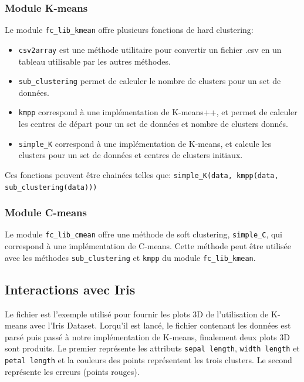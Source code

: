 \documentclass{article}
\begin{document}
      \subsubsection{Module K-means}
        Le module \texttt{fc\_lib\_kmean} offre plusieurs fonctions de hard clustering:

        \begin{itemize}
          \item \texttt{csv2array} est une méthode utilitaire pour convertir un fichier .csv en un tableau utilisable par les autres méthodes.
          \item \texttt{sub\_clustering} permet de calculer le nombre de clusters pour un set de données.
          \item \texttt{kmpp} correspond à une implémentation de K-means++, et permet de calculer les centres de départ pour un set de données et nombre de clusters donnés.
          \item \texttt{simple\_K} correspond à une implémentation de K-means, et calcule les clusters pour un set de données et centres de clusters initiaux.
        \end{itemize}

        Ces fonctions peuvent être chainées telles que: \texttt{simple\_K(data, kmpp(data, sub\_clustering(data)))}

      \subsubsection{Module C-means}
        Le module \texttt{fc\_lib\_cmean} offre une méthode de soft clustering, \texttt{simple\_C}, qui correspond à une implémentation de C-means. Cette méthode peut être utilisée avec les méthodes \texttt{sub\_clustering} et \texttt{kmpp} du module \texttt{fc\_lib\_kmean}.

    \subsection{Interactions avec Iris}

    Le fichier  est l'exemple utilisé pour fournir les plots 3D de l'utilisation de K-means avec l'Iris Dataset.
    Lorqu'il est lancé, le fichier  contenant les données est parsé puis passé à notre implémentation de K-means,
    finalement deux plots 3D sont produits.
    Le premier représente les attributs \texttt{sepal length}, \texttt{width length} et \texttt{petal length} et la couleurs des points
    représentent les trois clusters.
    Le second représente les erreurs (points rouges).
\end{document}
